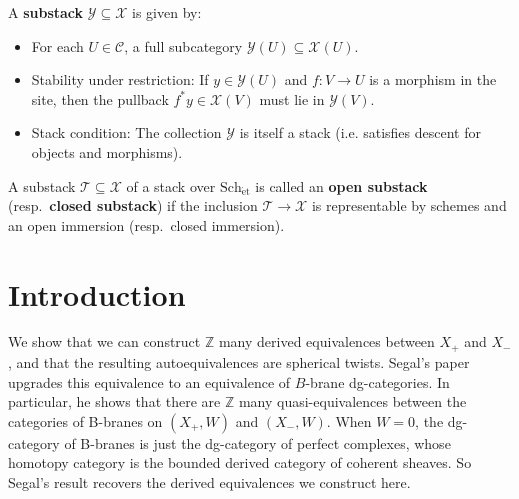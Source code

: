 \documentclass[12pt]{article}
\begin{document}
\begin{definition}[Substack]
  A \textbf{substack} $\mathcal{Y}\subseteq \mathcal{X}$ is given by:
  \begin{itemize}
    \item For each $U\in\mathcal{C}$, a full subcategory $\mathcal{Y}(U)\subseteq \mathcal{X}(U)$.
    \item Stability under restriction:
          If $y\in \mathcal{Y}(U)$ and $f:V\to U$ is a morphism in the site, then the pullback $f^*y \in \mathcal{X}(V)$ must lie in $\mathcal{Y}(V)$.
    \item Stack condition:
          The collection $\mathcal{Y}$ is itself a stack (i.e. satisfies descent for objects and morphisms).
  \end{itemize}
\end{definition}

\begin{definition}\label{def:open-closed-substacks}
  A substack $\mathcal{T} \subseteq \mathcal{X}$ of a stack over $\mathrm{Sch}_{\mathrm{\acute{e}t}}$
  is called an \textbf{open substack} (resp.\ \textbf{closed substack}) if the inclusion
  $\mathcal{T} \to \mathcal{X}$ is representable by schemes and an open immersion (resp.\ closed immersion).
\end{definition}

\section{Introduction}
We show that we can construct $\mathbb{Z}$ many derived equivalences between $X_+$ and $X_-$, and that the resulting autoequivalences are spherical twists. Segal's paper upgrades this equivalence to an equivalence of $B$-brane dg-categories. In particular, he shows that there are $\mathbb{Z}$ many quasi-equivalences between the categories of B-branes on $(X_+, W)$ and $(X_-, W)$. When $W=0$, the dg-category of B-branes is just the dg-category of perfect complexes, whose homotopy category is the bounded derived category of coherent sheaves. So Segal's result recovers the derived equivalences we construct here.



\end{document}
